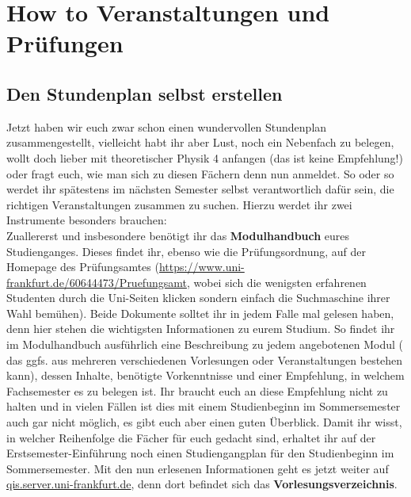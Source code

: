 \section{How to Veranstaltungen und Prüfungen}
\subsection{Den Stundenplan selbst erstellen}
Jetzt haben wir euch zwar schon einen wundervollen Stundenplan zusammengestellt, vielleicht habt ihr aber Lust, noch ein Nebenfach zu belegen, wollt doch lieber mit theoretischer Physik 4 anfangen (das ist keine Empfehlung!) oder fragt euch, wie man sich zu diesen Fächern denn nun anmeldet. So oder so werdet ihr spätestens im nächsten Semester selbst verantwortlich dafür sein, die richtigen Veranstaltungen zusammen zu suchen. Hierzu werdet ihr zwei Instrumente besonders brauchen:\\
Zuallererst und insbesondere benötigt ihr das \textbf{Modulhandbuch} eures Studienganges. Dieses findet ihr, ebenso wie die Prüfungsordnung, auf der Homepage des Prüfungsamtes (\url{https://www.uni-frankfurt.de/60644473/Pruefungsamt}, wobei sich die wenigsten erfahrenen Studenten durch die Uni-Seiten klicken sondern einfach die Suchmaschine ihrer Wahl bemühen). Beide Dokumente solltet ihr in jedem Falle mal gelesen haben, denn hier stehen die wichtigsten Informationen zu eurem Studium. So findet ihr im Modulhandbuch ausführlich eine Beschreibung zu jedem angebotenen Modul ( das ggfs. aus mehreren verschiedenen Vorlesungen oder Veranstaltungen bestehen kann), dessen Inhalte, benötigte Vorkenntnisse und einer Empfehlung, in welchem Fachsemester es zu belegen ist. Ihr braucht euch an diese Empfehlung nicht zu halten und in vielen Fällen ist dies mit einem Studienbeginn im Sommersemester auch gar nicht möglich, es gibt euch aber einen guten Überblick. Damit ihr wisst, in welcher Reihenfolge die Fächer für euch gedacht sind, erhaltet ihr auf der Erstsemester-Einführung noch einen Studiengangplan für den Studienbeginn im Sommersemester. Mit den nun erlesenen Informationen geht es jetzt weiter auf \url{qis.server.uni-frankfurt.de}, denn dort befindet sich das \textbf{Vorlesungsverzeichnis}.\\
